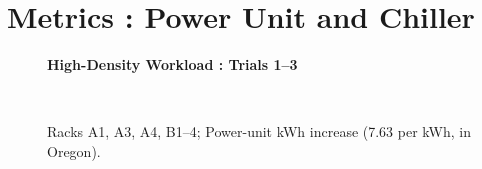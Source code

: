 \documentclass{report}
\begin{document}
\chapter{Metrics : Power Unit and Chiller}
\begin{figure}[!h]
\centerline{\bfseries\large High-Density Workload : Trials 1--3}\\
\caption{Racks A1, A3, A4, B1--4; Power-unit kWh increase (7.63\textcent{} per kWh, in Oregon).}
\end{figure}
\end{document}
